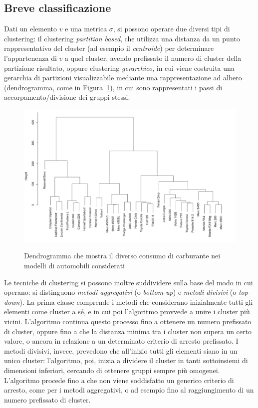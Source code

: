 \documentclass[oneside, openany]{book}
\begin{document}
		\subsection{Breve classificazione}
			Dati un elemento $v$ e una metrica $\sigma$, si possono operare due diversi tipi di clustering: il clustering \textit{partition based}, che utilizza una distanza da un punto rappresentativo del cluster (ad esempio il \textit{centroide}) per determinare l'appartenenza di $v$ a quel cluster, avendo prefissato il numero di cluster della partizione risultato, oppure clustering \textit{gerarchico}, in cui viene costruita una gerarchia di partizioni visualizzabile mediante una rappresentazione ad albero (dendrogramma, come in Figura~\ref{fig:dendrogramma}), in cui sono rappresentati i passi di accorpamento/divisione dei gruppi stessi.\\
			\begin{figure}[h]
				\centering
				{\includegraphics[width=.80\textwidth]{dendrogramma.png}} \quad
				\caption{Dendrogramma che mostra il diverso consumo di carburante nei modelli di automobili considerati}
				\label{fig:dendrogramma}
			\end{figure}
			Le tecniche di clustering si possono inoltre suddividere sulla base del modo in cui operano: si distinguono \textit{metodi aggregativi} (o \textit{bottom-up}) e \textit{metodi divisivi} (o \textit{top-down}). La prima classe comprende i metodi che considerano inizialmente tutti gli elementi come cluster a sé, e in cui poi l'algoritmo provvede a unire i cluster più vicini. L'algoritmo continua questo processo fino a ottenere un numero prefissato di cluster, oppure fino a che la distanza minima tra i cluster non supera un certo valore, o ancora in relazione a un determinato criterio di arresto prefissato.
			I metodi divisivi, invece, prevedono che all'inizio tutti gli elementi siano in un unico cluster: l'algoritmo, poi, inizia a dividere il cluster in tanti sottoinsiemi di dimensioni inferiori, cercando di ottenere gruppi sempre più omogenei. L'algoritmo procede fino a che non viene soddisfatto un generico criterio di arresto, come per i metodi aggregativi, o ad esempio fino al raggiungimento di un numero prefissato di cluster.\\
\end{document}
